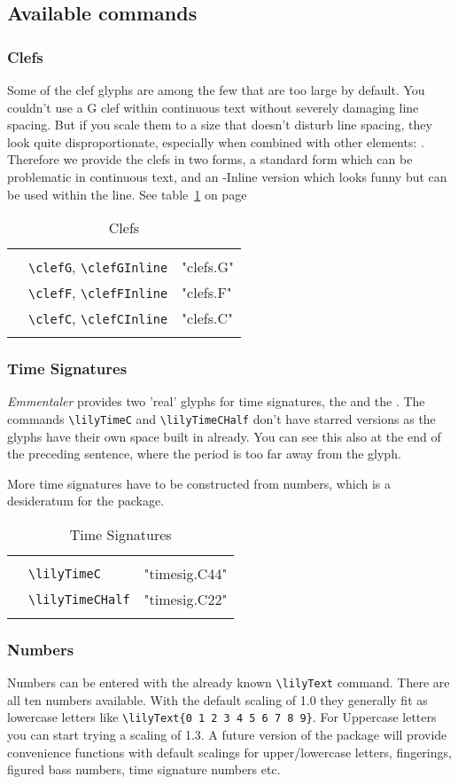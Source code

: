 \documentclass{article}
\newcommand*{\cmd}[1]{\texttt{\textbackslash #1}}
\newcommand{\tmpCaption}{} %
\newcommand{\tmpLabel}{}
\newenvironment{reftable}[2]
	{%
		\renewcommand{\tmpCaption}{#1}
		\renewcommand{\tmpLabel}{#2}
		\begin{table}[ht]
		\begin{center}
		\begin{tabular}[t]{lll}
		\hline
		&\\
	}
	{%
		&\\
		\hline
		\end{tabular}
		\caption{\tmpCaption}
		\label{table:\tmpLabel}
		\end{center}
		\end{table}
	}
\begin{document}
\subsection{Available commands}

\subsubsection{Clefs}
Some of the clef glyphs are among the few that are too large by default. 
You couldn't use a G clef within continuous text without severely \clefG damaging line spacing. 
But if you scale them to a size that doesn't disturb line spacing, they look quite disproportionate, especially when combined with other elements: \clefCInline \natural.
Therefore we provide the clefs in two forms, a standard form which can be problematic in continuous text, and an -Inline version which looks funny but can be used within the line.
See table~\ref{table:clefs} on page~\pageref{table:clefs}

\begin{reftable}{Clefs}{clefs}
\clefGInline & \cmd{clefG}, \cmd{clefGInline} & "clefs.G"\\
\clefFInline & \cmd{clefF}, \cmd{clefFInline} & "clefs.F"\\
\clefCInline & \cmd{clefC}, \cmd{clefCInline} & "clefs.C"\\
\end{reftable}

\subsubsection{Time Signatures}
\emph{Emmentaler} provides two 'real' glyphs for time signatures, the \lilyTimeC and the \lilyTimeCHalf.
The commands \cmd{lilyTimeC} and \cmd{lilyTimeCHalf} don't have starred versions as the glyphs have their own space built in already. 
You can see this also at the end of the preceding sentence, where the period is too far away from the glyph.

More time signatures have to be constructed from numbers, which is a desideratum for the package.

\begin{reftable}{Time Signatures}{timesignatures}
\lilyTimeC & \cmd{lilyTimeC} & "timesig.C44"\\
\lilyTimeCHalf & \cmd{lilyTimeCHalf} & "timesig.C22"\\
\end{reftable}


\subsubsection{Numbers}
Numbers can be entered with the already known \cmd{lilyText} command. 
There are all ten numbers available. 
With the default scaling of 1.0 they generally fit as lowercase letters like  \cmd{lilyText\{0 1 2 3 4 5 6 7 8 9\}}. 
For Uppercase letters you can start trying a scaling of 1.3. A future version of the package will provide convenience functions with default scalings for upper/lowercase letters, fingerings, figured bass numbers, time signature numbers etc.
\end{document}
